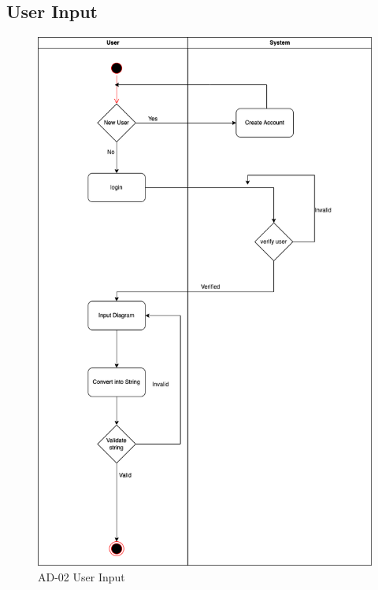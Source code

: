 \documentclass[12pt,a4paper]{article}
\begin{document}
\subsection{User Input}
\begin{figure}[hb]
 \centering
\includegraphics[scale=0.46]{Diagram/Input_Activity_Diagram.png}
\caption{AD-02 User Input}
\end{figure}
\newpage
\end{document}
